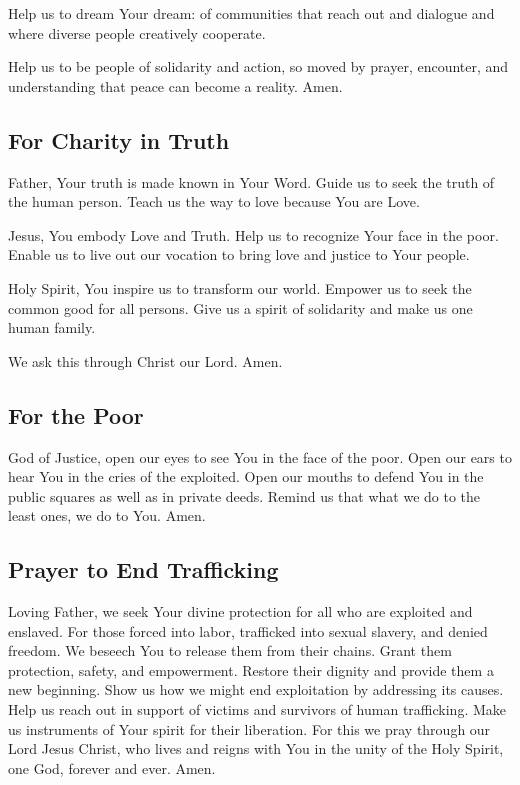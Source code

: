 \documentclass[12pt]{article}
\newcommand{\prayertitle}[1]{\subsection{#1}}
\begin{document}
Help us to dream Your dream:
of communities that reach out and dialogue and where diverse people creatively cooperate.

Help us to be people of solidarity and action, so moved by prayer, encounter, and understanding that peace can become a reality.
Amen.

\prayertitle{For Charity in Truth}
Father, Your truth is made known in Your Word.
Guide us to seek the truth of the human person.
Teach us the way to love because You are Love.

Jesus, You embody Love and Truth.
Help us to recognize Your face in the poor.
Enable us to live out our vocation to bring love and justice to Your people.

Holy Spirit, You inspire us to transform our world.
Empower us to seek the common good for all persons.
Give us a spirit of solidarity and make us one human family.

We ask this through Christ our Lord. Amen.

\prayertitle{For the Poor}
God of Justice, open our eyes to see You in the face of the poor.
Open our ears to hear You in the cries of the exploited.
Open our mouths to defend You in the public squares as well as in private deeds.
Remind us that what we do to the least ones, we do to You.
Amen.

\prayertitle{Prayer to End Trafficking}
Loving Father, we seek Your divine protection for all who are exploited and enslaved.
For those forced into labor, trafficked into sexual slavery, and denied freedom.
We beseech You to release them from their chains.
Grant them protection, safety, and empowerment.
Restore their dignity and provide them a new beginning.
Show us how we might end exploitation by addressing its causes.
Help us reach out in support of victims and survivors of human trafficking.
Make us instruments of Your spirit for their liberation.
For this we pray through our Lord Jesus Christ, who lives and reigns with You in the unity of the Holy Spirit, one God, forever and ever.
Amen.
\end{document}
